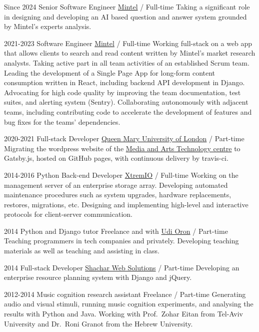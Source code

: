 \documentclass[]{friggeri-cv}
\begin{document}
\begin{entrylist}

  \entry
  {Since 2024}
  {Senior Software Engineer}
  {\href{https://www.mintel.com/}{Mintel} / Full-time}
  {
    Taking a significant role in designing and developing an AI based question and answer system grounded by Mintel's experts analysis.
  }

  \entry
  {2021-2023}
  {Software Engineer}
  {\href{https://www.mintel.com/}{Mintel} / Full-time}
  {
    Working full-stack on a web app that allows clients to search and read content written by Mintel's market research analysts. Taking active part in all team activities of an established Scrum team.
    Leading the development of a Single Page App for long-form content consumption written in React, including backend API development in Django.
    Advocating for high code quality by improving the team documentation, test suites, and alerting system (Sentry).
    Collaborating autonomously with adjacent teams, including contributing code to accelerate the development of features and bug fixes for the teams' dependencies.
  }

  \entry
  {2020-2021}
  {Full-stack Developer}
  {\href{https://qmul.ac.uk/}{Queen Mary University of London} / Part-time}
  {
    Migrating the wordpress website of the \href{https://mat.qmul.ac.uk/}{Media and Arts Technology centre} to Gatsby.js, hosted on GitHub pages, with continuous delivery by travis-ci.
  }

  \entry
  {2014-2016}
  {Python Back-end Developer}
  {\href{http://xtremio.com/}{XtremIO} / Full-time}
  {
    Working on the management server of an enterprise storage array.
    Developing automated maintenance procedures such as system upgrades, hardware replacements, restores, migrations, etc.
    Designing and implementing high-level and interactive protocols for client-server communication.
  }

  \entry
  {2014}
  {Python and Django tutor}
  {Freelance and with \href{http://www.10x.org.il/}{Udi Oron} / Part-time}
  {
    Teaching programmers in tech companies and privately.
    Developing teaching materials as well as teaching and assisting in class.
  }

  \entry
  {2014}
  {Full-stack Developer}
  {\href{http://www.shachar-web.co.il/eng/}{Shachar Web Solutions} / Part-time}
  {
    Developing an enterprise resource planning system with Django and jQuery.
  }

  \entry
  {2012-2014}
  {Music cognition research assistant}
  {Freelance / Part-time}
  {
    Generating audio and visual stimuli, running music cognition experiments, and analysing the results with Python and Java.
    Working with Prof.\ Zohar Eitan from Tel-Aviv University and Dr.\ Roni Granot from the Hebrew University.
  }


\end{entrylist}
\end{document}
